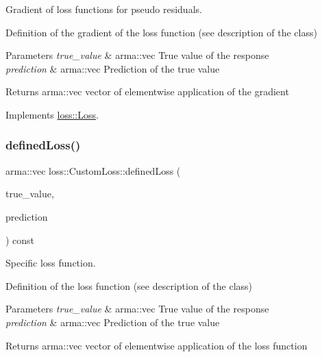 Gradient of loss functions for pseudo residuals. 

Definition of the gradient of the loss function (see description of the class)


\begin{DoxyParams}{Parameters}
{\em true\+\_\+value} & {\ttfamily arma\+::vec} True value of the response \\
\hline
{\em prediction} & {\ttfamily arma\+::vec} Prediction of the true value\\
\hline
\end{DoxyParams}
\begin{DoxyReturn}{Returns}
{\ttfamily arma\+::vec} vector of elementwise application of the gradient 
\end{DoxyReturn}


Implements \mbox{\hyperlink{classloss_1_1_loss_a267a4de70747ade4b2d84ce35a448979}{loss\+::\+Loss}}.

\mbox{\label{classloss_1_1_custom_loss_a2a96bc5e4b4894bbaa64745a3f7c0fd5}} 
\subsubsection{\texorpdfstring{defined\+Loss()}{definedLoss()}}
{\footnotesize\ttfamily arma\+::vec loss\+::\+Custom\+Loss\+::defined\+Loss (\begin{DoxyParamCaption}\item[{const arma\+::vec \&}]{true\+\_\+value,  }\item[{const arma\+::vec \&}]{prediction }\end{DoxyParamCaption}) const\hspace{0.3cm}{\ttfamily [virtual]}}



Specific loss function. 

Definition of the loss function (see description of the class)


\begin{DoxyParams}{Parameters}
{\em true\+\_\+value} & {\ttfamily arma\+::vec} True value of the response \\
\hline
{\em prediction} & {\ttfamily arma\+::vec} Prediction of the true value\\
\hline
\end{DoxyParams}
\begin{DoxyReturn}{Returns}
{\ttfamily arma\+::vec} vector of elementwise application of the loss function 
\end{DoxyReturn}


